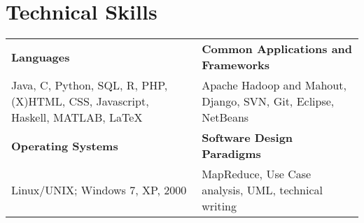 \documentclass[letterpaper]{article}
\begin{document}
  \section{Technical Skills}
  \noindent
  \begin{tabularx}{\textwidth}{@{}X X@{}}
    \textbf{Languages}                                          &  \textbf{Common Applications and Frameworks} \\
    Java, C, Python, SQL, R, PHP, (X)HTML, CSS, Javascript,
    Haskell, MATLAB, \LaTeX                                     &  Apache Hadoop and Mahout, Django, SVN, Git, Eclipse, NetBeans \\[0.2cm]
    \textbf{Operating Systems}                                  &  \textbf{Software Design Paradigms} \\
    Linux/UNIX; Windows 7, XP, 2000                             &  MapReduce, Use Case analysis, UML, technical writing
  \end{tabularx}


\end{document}
